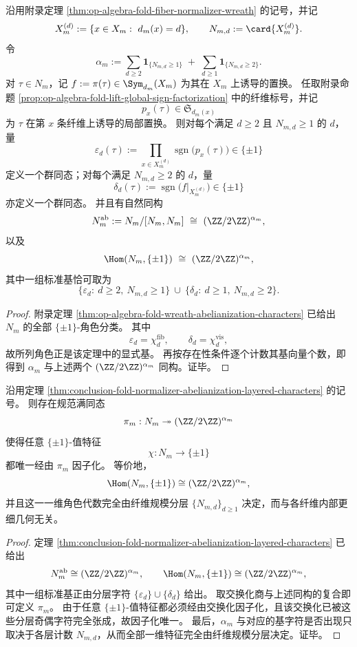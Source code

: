 \begin{theorem}\label{thm:conclusion-fold-normalizer-abelianization-layered-characters}
沿用附录定理 \ref{thm:op-algebra-fold-fiber-normalizer-wreath} 的记号，并记
\[
X_m^{(d)}:=\{x\in X_m:\ d_m(x)=d\},
\qquad
N_{m,d}:=\card{X_m^{(d)}}.
\]
令
\[
\alpha_m
:=
\sum_{d\ge 2}\mathbf 1_{\{N_{m,d}\ge 1\}}
\;+\;
\sum_{d\ge 1}\mathbf 1_{\{N_{m,d}\ge 2\}}.
\]
对 \(\tau\in N_m\)，记 \(f:=\pi(\tau)\in \Sym_{d_m}(X_m)\) 为其在 \(X_m\) 上诱导的置换。
任取附录命题 \ref{prop:op-algebra-fold-lift-global-sign-factorization} 中的纤维标号，并记
\[
p_x(\tau)\in \mathfrak S_{d_m(x)}
\]
为 \(\tau\) 在第 \(x\) 条纤维上诱导的局部置换。
则对每个满足 \(d\ge 2\) 且 \(N_{m,d}\ge 1\) 的 \(d\)，量
\[
\varepsilon_d(\tau)
:=
\prod_{x\in X_m^{(d)}}\operatorname{sgn}\bigl(p_x(\tau)\bigr)\in\{\pm1\}
\]
定义一个群同态；对每个满足 \(N_{m,d}\ge 2\) 的 \(d\)，量
\[
\delta_d(\tau)
:=
\operatorname{sgn}\bigl(f|_{X_m^{(d)}}\bigr)\in\{\pm1\}
\]
亦定义一个群同态。
并且有自然同构
\[
N_m^{\mathrm{ab}}
:=
N_m/[N_m,N_m]
\ \cong\
(\ZZ/2\ZZ)^{\alpha_m},
\]
以及
\[
\Hom(N_m,\{\pm1\})
\ \cong\
(\ZZ/2\ZZ)^{\alpha_m},
\]
其中一组标准基恰可取为
\[
\{\varepsilon_d:\ d\ge 2,\ N_{m,d}\ge 1\}
\ \cup\
\{\delta_d:\ d\ge 1,\ N_{m,d}\ge 2\}.
\]
\end{theorem}
\begin{proof}
附录定理 \ref{thm:op-algebra-fold-wreath-abelianization-characters} 已给出 \(N_m\) 的全部 \(\{\pm1\}\)-角色分类。
其中
\[
\varepsilon_d=\chi_d^{\mathrm{fib}},
\qquad
\delta_d=\chi_d^{\mathrm{vis}},
\]
故所列角色正是该定理中的显式基。
再按存在性条件逐个计数其基向量个数，即得到
\(
\alpha_m
\)
与上述两个 \((\ZZ/2\ZZ)^{\alpha_m}\) 同构。证毕。
\end{proof}

\begin{theorem}[折叠正常化子的一维特征完全由纤维规模分层决定]\label{thm:conclusion-fold-normalizer-characters-completely-stratified}
沿用定理 \ref{thm:conclusion-fold-normalizer-abelianization-layered-characters} 的记号。
则存在规范满同态
\[
\pi_m:N_m\twoheadrightarrow (\ZZ/2\ZZ)^{\alpha_m}
\]
使得任意 \(\{\pm1\}\)-值特征
\[
\chi:N_m\to\{\pm1\}
\]
都唯一经由 \(\pi_m\) 因子化。
等价地，
\[
\Hom(N_m,\{\pm1\})\cong (\ZZ/2\ZZ)^{\alpha_m},
\]
并且这一一维角色代数完全由纤维规模分层
\(
\{N_{m,d}\}_{d\ge 1}
\)
决定，而与各纤维内部更细几何无关。
\end{theorem}
\begin{proof}
定理 \ref{thm:conclusion-fold-normalizer-abelianization-layered-characters} 已给出
\[
N_m^{\mathrm{ab}}\cong (\ZZ/2\ZZ)^{\alpha_m},
\qquad
\Hom(N_m,\{\pm1\})\cong (\ZZ/2\ZZ)^{\alpha_m},
\]
其中一组标准基正由分层字符
\(
\{\varepsilon_d\}\cup\{\delta_d\}
\)
给出。
取交换化商与上述同构的复合即可定义 \(\pi_m\)。
由于任意 \(\{\pm1\}\)-值特征都必须经由交换化因子化，且该交换化已被这些分层奇偶字符完全张成，故因子化唯一。
最后，\(\alpha_m\) 与对应的基字符是否出现只取决于各层计数 \(N_{m,d}\)，从而全部一维特征完全由纤维规模分层决定。证毕。
\end{proof}

